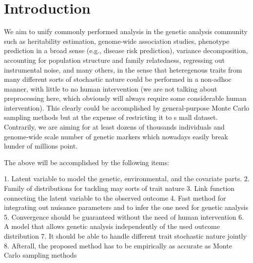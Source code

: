 \section{Introduction}

We aim to unify commonly performed analysis in the genetic analysis community such as heritability estimation, genome-wide association studies, phenotype prediction in a broad sense (e.g., disease risk prediction), variance decomposition, accounting for population structure and family relatedness, regressing out instrumental noise, and many others, in the sense that heteregenous traits from many different sorts of stochastic nature could be performed in a non-adhoc manner, with little to no human intervention (we are not talking about preprocessing here, which obviously will always require some considerable human intervention). This clearly could be accomplished by general-purpose Monte Carlo sampling methods but at the expense of restricting it to s	mall dataset. Contrarily, we are aiming for at least dozens of thousands individuals and genome-wide scale number of genetic markers which nowadays easily break hunder of millions point.

The above will be accomplished by the following items:

1. Latent variable to model the genetic, environmental, and the covariate parts.
2. Family of distributions for tackling may sorts of trait nature
3. Link function connecting the latent variable to the observed outcome
4. Fast method for integrating out nuisance parameters and to infer the one need for genetic analysis
5. Convergence should be guaranteed without the need of human intervention
6. A model that allows genetic analysis independently of the used outcome distribution
7. It should be able to handle different trait stochastic nature jointly
8. Afterall, the proposed method has to be empirically as accurate as Monte Carlo sampling methods
